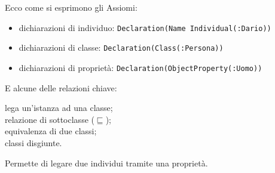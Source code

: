 Ecco come si esprimono gli Assiomi: 
\begin{itemize}
	\item dichiarazioni di individuo: \texttt{Declaration(Name Individual(:Dario))}
	\item dichiarazioni di classe: \texttt{Declaration(Class(:Persona))}
	\item dichiarazioni di proprietà: \texttt{Declaration(ObjectProperty(:Uomo))}
\end{itemize}
E alcune delle relazioni chiave:

 lega un'istanza ad una classe; \\
 relazione di sottoclasse ($ \sqsubseteq $); \\
 equivalenza di due classi;\\
 classi disgiunte.

Permette di legare due individui tramite una proprietà.
